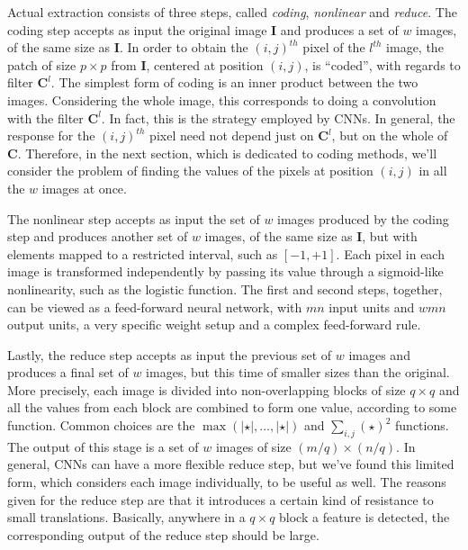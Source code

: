 \documentclass[runningheads,a4paper]{llncs}
\newcommand{\hctimes}[2]{{#1}\!\times\!{#2}}
\begin{document}
Actual extraction consists of three steps, called \emph{coding}, \emph{nonlinear} and \emph{reduce}. The coding step accepts as input the original image $\textbf{I}$ and produces a set of $w$ images, of the same size as $\textbf{I}$. In order to obtain the $(i,j)^{th}$ pixel of the $l^{th}$ image, the patch of size $\hctimes{p}{p}$ from $\textbf{I}$, centered at position $(i,j)$, is ``coded'', with regards to filter $\textbf{C}^l$. The simplest form of coding is an inner product between the two images. Considering the whole image, this corresponds to doing a convolution with the filter $\textbf{C}^l$. In fact, this is the strategy employed by CNNs. In general, the response for the $(i,j)^{th}$ pixel need not depend just on $\textbf{C}^l$, but on the whole of $\textbf{C}$. Therefore, in the next section, which is dedicated to coding methods, we'll consider the problem of finding the values of the pixels at position $(i,j)$ in all the $w$ images at once.

The nonlinear step accepts as input the set of $w$ images produced by the coding step and produces another set of $w$ images, of the same size as $\textbf{I}$, but with elements mapped to a restricted interval, such as $[-1,+1]$. Each pixel in each image is transformed independently by passing its value through a sigmoid-like nonlinearity, such as the logistic function. The first and second steps, together, can be viewed as a feed-forward neural network, with $mn$ input units and $wmn$ output units, a very specific weight setup and a complex feed-forward rule.

Lastly, the reduce step accepts as input the previous set of $w$ images and produces a final set of $w$ images, but this time of smaller sizes than the original. More precisely, each image is divided into non-overlapping blocks of size $\hctimes{q}{q}$ and all the values from each block are combined to form one value, according to some function. Common choices are the $\max(\left|\star\right|,\dots,\left|\star\right|)$ and $\sum_{i,j}{(\star)^2}$ functions. The output of this stage is a set of $w$ images of size $\hctimes{(m / q)}{(n / q)}$. In general, CNNs can have a more flexible reduce step, but we've found this limited form, which considers each image individually, to be useful as well. The reasons given for the reduce step are that it introduces a certain kind of resistance to small translations. Basically, anywhere in a $\hctimes{q}{q}$ block a feature is detected, the corresponding output of the reduce step should be large.
\end{document}
